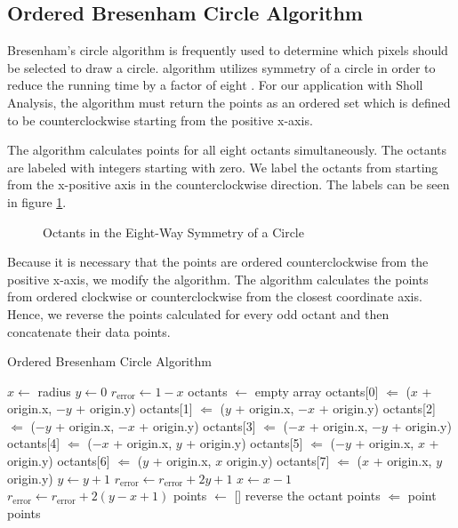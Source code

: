 \documentclass{sig-alternate}
\begin{document}
	\subsection{Ordered Bresenham Circle Algorithm} %
	\label{app:Ordered Bresenham Circle Algorithm}
		Bresenham's circle algorithm is frequently used to determine which
		pixels should be selected to draw a circle. algorithm utilizes
		symmetry of a circle in order to reduce the running time by a
		factor of eight \cite{bresenham77}. For our application with Sholl
		Analysis, the algorithm must return the points as an ordered set
		which is defined to be counterclockwise starting from the positive
		x-axis.

		The algorithm calculates points for all eight octants simultaneously.
		The octants are labeled with integers starting with zero. We label the
		octants from starting from the x-positive axis in the counterclockwise
		direction. The labels can be seen in figure \ref{fig:eightsymmetry}.
		\begin{figure}[htp]
			\centering
			
			\caption{Octants in the Eight-Way Symmetry of a Circle}
			\label{fig:eightsymmetry}
		\end{figure}
		Because it is necessary that the points are ordered
		counterclockwise from the positive x-axis, we modify the
		algorithm. The algorithm calculates the points from ordered
		clockwise or counterclockwise from the closest coordinate axis.
		Hence, we reverse the points calculated for every odd octant and
		then concatenate their data points.

		\begin{algorithm}[htp!]
			\caption{Ordered Bresenham Circle Algorithm}
			\begin{algorithmic}
					\State $x \gets$ radius
					\State $y \gets 0$
					\State $r_{\text{error}} \gets 1 - x$
					\State octants $\gets$ empty array
						\State octants[0] $\Leftarrow$ ($x$ + origin.x, $-y$ + origin.y)
						\State octants[1] $\Leftarrow$ ($y$ + origin.x, $-x$ + origin.y)
						\State octants[2] $\Leftarrow$ ($-y$ + origin.x, $-x$ + origin.y)
						\State octants[3] $\Leftarrow$ ($-x$ + origin.x, $-y$ + origin.y)
						\State octants[4] $\Leftarrow$ ($-x$ + origin.x, $y$ + origin.y)
						\State octants[5] $\Leftarrow$ ($-y$ + origin.x, $x$ + origin.y)
						\State octants[6] $\Leftarrow$ ($y$ + origin.x, $x$ origin.y)
						\State octants[7] $\Leftarrow$ ($x$ + origin.x, $y$ origin.y)
						\State $y \gets y + 1$
							\State $r_{\text{error}} \gets r_{\text{error}} + 2y + 1$
						\Else
							\State $x \gets x - 1$
							\State $r_{\text{error}} \gets r_{\text{error}} + 2(y - x + 1)$
						\EndIf
					\EndWhile
					\State points $\gets$ []
							\State reverse the octant
						\EndIf
							\State points $\Leftarrow$ point
						\EndFor
					\EndFor
					\State \Return points
				\EndProcedure
			\end{algorithmic}
		\end{algorithm}

\end{document}
